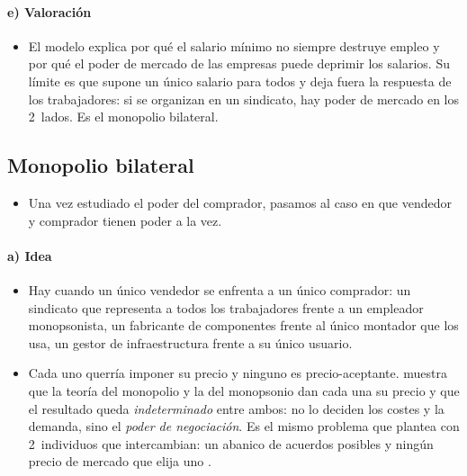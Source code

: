 \documentclass[11pt]{article}
\begin{document}
\paragraph{e) Valoración}

\begin{itemize}
\item El modelo explica por qué el salario mínimo no siempre destruye empleo y por qué el poder de mercado de las empresas puede deprimir los salarios. Su límite es que supone un único salario para todos y deja fuera la respuesta de los trabajadores: si se organizan en un sindicato, hay poder de mercado en los 2~lados. Es el monopolio bilateral.
\end{itemize}

\subsection{Monopolio bilateral}\label{sec:monopolio-bilateral}

\begin{itemize}
\item Una vez estudiado el poder del comprador, pasamos al caso en que vendedor y comprador tienen poder a la vez.
\end{itemize}

\paragraph{a) Idea}

\begin{itemize}
\item Hay  cuando un único vendedor se enfrenta a un único comprador: un sindicato que representa a todos los trabajadores frente a un empleador monopsonista, un fabricante de componentes frente al único montador que los usa, un gestor de infraestructura frente a su único usuario.
\item Cada uno querría imponer su precio y ninguno es precio-aceptante. \textcite{Bowley1928Bilateral} muestra que la teoría del monopolio y la del monopsonio dan cada una su precio y que el resultado queda \emph{indeterminado} entre ambos: no lo deciden los costes y la demanda, sino el \emph{poder de negociación}\nocite{Fellner1947Prices}. Es el mismo problema que \textcite{Edgeworth1881Mathematical} plantea con 2~individuos que intercambian: un abanico de acuerdos posibles y ningún precio de mercado que elija uno .
\end{itemize}
\end{document}
